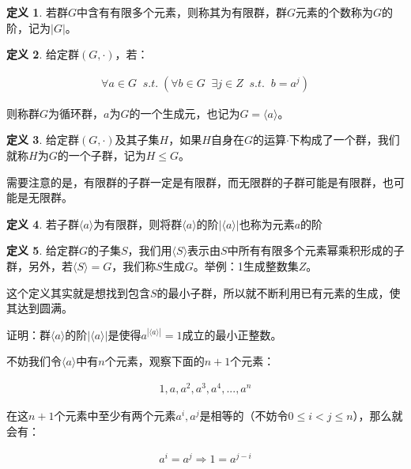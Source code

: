 \documentclass[12pt, a4paper, oneside]{ctexart}
\theoremstyle{definition}
\newtheorem*{definition}{定义}
\begin{document}
\begin{definition}
若群$G$中含有有限多个元素，则称其为有限群，群$G$元素的个数称为$G$的阶，记为$|G|$。
\end{definition}

\begin{definition}
给定群$(G,\cdot)$，若：

\begin{align*}
\forall a\in G\;\; s.t.\;(\forall b\in G\;\; \exists j\in Z\;\; s.t.\;\;b=a^j)
\end{align*}

则称群$G$为循环群，$a$为$G$的一个生成元，也记为$G = \langle a \rangle$。
\end{definition}

\begin{definition}
给定群$(G,\cdot)$及其子集$H$，如果$H$自身在$G$的运算$\cdot$下构成了一个群，我们就称$H$为$G$的一个子群，记为$H\leqslant G$。
\end{definition}

需要注意的是，有限群的子群一定是有限群，而无限群的子群可能是有限群，也可能是无限群。

\begin{definition}
若子群$\langle a \rangle$为有限群，则将群$\langle a \rangle$的阶$|\langle a \rangle|$也称为元素$a$的阶
\end{definition}

\begin{definition}
给定群$G$的子集$S$，我们用$\langle S \rangle$表示由$S$中所有有限多个元素幂乘积形成的子群，另外，若$\langle S \rangle=G$，我们称$S$生成$G$。举例：1生成整数集$Z$。
\end{definition}

这个定义其实就是想找到包含$S$的最小子群，所以就不断利用已有元素的生成，使其达到圆满。

证明：群$\langle a \rangle$的阶$|\langle a \rangle|$是使得$a^{|\langle a \rangle|}=1$成立的最小正整数。

不妨我们令$\langle a \rangle$中有$n$个元素，观察下面的$n+1$个元素：

\begin{align*}
1,a,a^2,a^3,a^4,...,a^n
\end{align*}

在这$n+1$个元素中至少有两个元素$a^i,a^j$是相等的（不妨令$0\leqslant i<j\leqslant n$），那么就会有：

\begin{align*}
a^i=a^j\Rightarrow 1=a^{j-i}
\end{align*}
\end{document}
